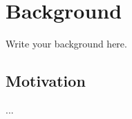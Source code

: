 \documentclass[../main.tex]{subfiles}
\begin{document}
\section{Background}
Write your background here.

\subsection{Motivation}
...
\end{document}
